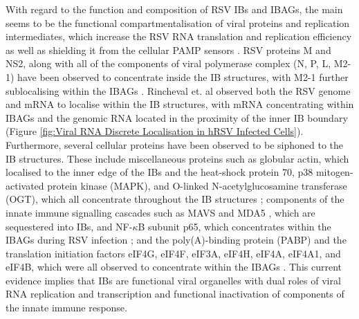 With regard to the function and composition of RSV IBs and IBAGs, the main seems to be the functional compartmentalisation of viral proteins and replication intermediates, which increase the RSV RNA translation and replication efficiency as well as shielding it from the cellular PAMP sensors \cite{McDonald2004EvidenceAnalysis, Rincheval2017FunctionalVirus, Jobe2020RespiratorySignaling}. RSV proteins M and NS2, along with all of the components of viral polymerase complex (N, P, L, M2-1) have been observed to concentrate inside the IB structures, with M2-1 further sublocalising within the IBAGs \cite{Weber1995NonstructuralSerum, Fricke2013P38Assembly, Rincheval2017FunctionalVirus, Jobe2021BovineResponses}. Rincheval et. al observed both the RSV genome and mRNA to localise within the IB structures, with mRNA concentrating within IBAGs and the genomic RNA located in the proximity of the inner IB boundary \cite{Rincheval2017FunctionalVirus} (Figure \ref{fig:Viral RNA Discrete Localisation in hRSV Infected Cells}). Furthermore, several cellular proteins have been observed to be siphoned to the IB structures. These include miscellaneous proteins such as globular actin, which localised to the inner edge of the IBs \cite{Brown2005EvidenceInfection} and the heat-shock protein 70, p38 mitogen-activated protein kinase (MAPK), and O-linked N-acetylglucosamine transferase (OGT), which all concentrate throughout the IB structures \cite{Brown2005EvidenceInfection, Fricke2013P38Assembly}; components of the innate immune signalling cascades such as MAVS and MDA5 \cite{Lifland2012HumanMAVS}, which are sequestered into IBs, and NF-\(\kappa\)B subunit p65, which concentrates within the IBAGs during RSV infection \cite{Jobe2020RespiratorySignaling}; and the poly(A)-binding protein (PABP) and the translation initiation factors eIF4G, eIF4F, eIF3A, eIF4H, eIF4A, eIF4A1, and eIF4B, which were all observed to concentrate within the IBAGs \cite{Rincheval2017FunctionalVirus, Jobe2023ViralCondensates}. This current evidence implies that IBs are functional viral organelles with dual roles of viral RNA replication and transcription and functional inactivation of components of the innate immune response.


